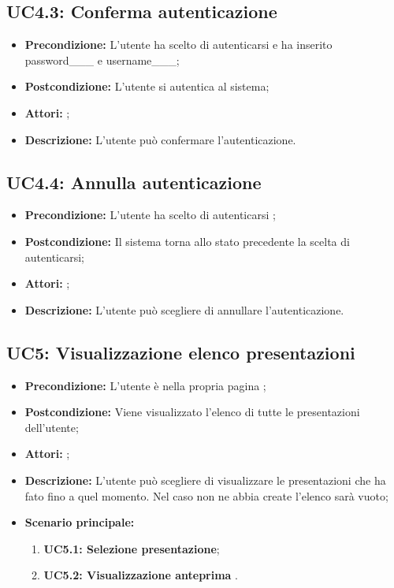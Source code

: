 \subsection{ UC4.3: Conferma autenticazione}

\begin{itemize}
	\item \textbf{Precondizione:} L'utente ha scelto di autenticarsi e ha inserito password___ e username___;
	\item \textbf{Postcondizione:} L'utente si autentica al sistema;
	\item \textbf{Attori:} ;
	\item \textbf{Descrizione:} L'utente può confermare l'autenticazione.
\end{itemize}
\subsection{ UC4.4: Annulla autenticazione}

\begin{itemize}
	\item \textbf{Precondizione:} L'utente ha scelto di autenticarsi ;
	\item \textbf{Postcondizione:} Il sistema torna allo stato precedente la scelta di autenticarsi;
	\item \textbf{Attori:} ;
	\item \textbf{Descrizione:} L'utente può scegliere di annullare l'autenticazione.
\end{itemize}
\subsection{ UC5: Visualizzazione elenco presentazioni}

\begin{itemize}
	\item \textbf{Precondizione:} L'utente è nella propria pagina ;
	\item \textbf{Postcondizione:} Viene visualizzato l'elenco di tutte le presentazioni dell'utente;
	\item \textbf{Attori:} ;
	\item \textbf{Descrizione:} L'utente può scegliere di visualizzare le presentazioni che ha fato fino a quel momento. Nel caso non ne abbia create l'elenco sarà vuoto;
	\item \textbf{Scenario principale:}
	\begin{enumerate}
		\item \textbf{ UC5.1: Selezione presentazione};
		\item \textbf{ UC5.2: Visualizzazione anteprima }.
	\end{enumerate}
\end{itemize}
